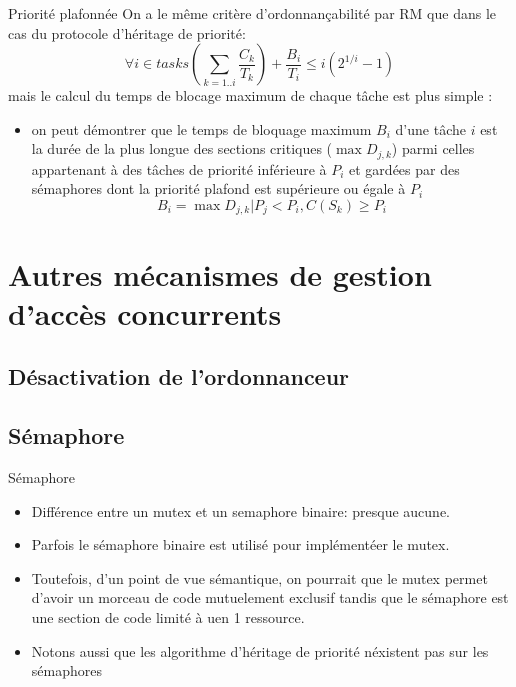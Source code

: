 \begin{frame}{Priorité plafonnée} 
  On a  le même critère d'ordonnançabilité  par RM que dans  le cas du
  protocole d'héritage de priorité:
  $$\forall i \in tasks \left( \sum_{k = 1..i} \frac{C_k}{T_k} \right) + \frac{B_i}{T_i} ≤ i(2^{1/i} - 1)$$
  mais le calcul du temps de  blocage maximum de chaque tâche est plus
  simple :
    \begin{itemize}
    \item on  peut démontrer  que le temps  de bloquage  maximum $B_i$
      d'une tâche  $i$ est la durée  de la plus  longue des sections
      critiques ($\max D_{j,k}$) parmi celles appartenant à des tâches
      de  priorité inférieure à  $P_i$ et  gardées par  des sémaphores
      dont la priorité plafond est supérieure ou égale à $P_i$
      $$B_i = \max D_{j,k} | P_j < P_i, C(S_k) ≥ P_i$$ 
    \end{itemize}
\end{frame}

\section{Autres mécanismes de gestion d'accès concurrents}

\subsection{Désactivation de l'ordonnanceur}


\subsection{Sémaphore}

\begin{frame}{Sémaphore}
  \begin{itemize} 
  \item  Différence entre un  mutex et  un semaphore  binaire: presque
    aucune.
  \item Parfois le sémaphore  binaire est utilisé pour implémentéer le
    mutex.
  \item Toutefois,  d'un point de  vue sémantique, on pourrait  que le
    mutex  permet  d'avoir un  morceau  de  code mutuelement  exclusif
    tandis que  le sémaphore est  une section de  code limité à  uen 1
    ressource.
  \item  Notons  aussi  que  les  algorithme  d'héritage  de  priorité
    néxistent pas sur les sémaphores
  \end{itemize} 
\end{frame} 

